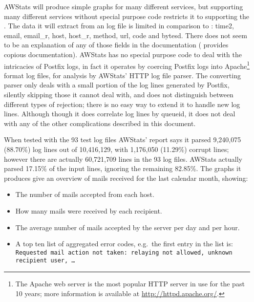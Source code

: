 \documentclass[a4paper,12pt,draft]{article}
\newcommand{\parsername}{\PLP{}}
\newcommand{\tab}[0]{%
    \hspace*{2em}%
}
\newcommand{\numberOFlogFILES}[0]{%
    93%
}
\newcommand{\numberOFlogLINES}[0]{%
    60,721,709%
}
\begin{document}
AWStats will produce simple graphs for many different services, but
supporting many different services without special purpose code restricts
it to supporting the \LCD{}.  The data it will extract from an \MTA{} log
file is limited in comparison to \parsername{}: \newline \tab{} time2,
email, email\_r, host, host\_r, method, url, code and bytesd.\newline
There does not seem to be an explanation of any of those fields in the
documentation (\parsername{} provides copious documentation).  AWStats has
no special purpose code to deal with the intricacies of Postfix logs, in
fact it operates by coercing Postfix logs into Apache\footnote{The Apache
web server is the most popular HTTP server in use for the past 10 years;
more information is available at \url{http://httpd.apache.org/}.} format
log files, for analysis by AWStats' HTTP log file parser.  The converting
parser only deals with a small portion of the log lines generated by
Postfix, silently skipping those it cannot deal with, and does not
distinguish between different types of rejection; there is no easy way to
extend it to handle new log lines.  Although though it does correlate log
lines by queueid, it does not deal with any of the other complications
described in this document.

When tested with the \numberOFlogFILES{} test log files AWStats' report
says it parsed 9,240,075 (88.70\%) log lines out of 10,416,129, with
1,176,050 (11.29\%) corrupt lines; however there are actually
\numberOFlogLINES{} lines in the \numberOFlogFILES{} log files.  AWStats
actually parsed 17.15\% of the input lines, ignoring the remaining 82.85\%.
The graphs it produces give an overview of mails received for the last
calendar month, showing:

\begin{itemize}

    \item The number of mails accepted from each host.

    \item How many mails were received by each recipient.
        
    \item The average number of mails accepted by the server per day and
        per hour.

    \item A top ten list of aggregated \SMTP{} error codes, e.g.\ the first
        entry in the list is: \texttt{Requested mail action not taken:
        relaying not allowed, unknown recipient user, \ldots}

\end{itemize}
\end{document}
